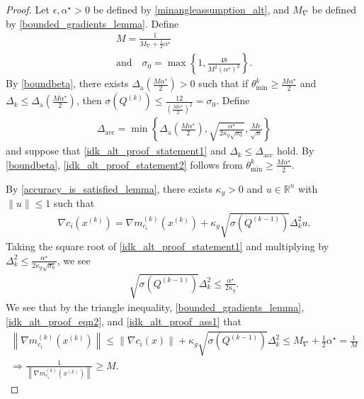\documentclass{article}
\theoremstyle{case}
\numberwithin{theorem}{subsection}
\newcommand{\dacc}{{\Delta_{\textrm{acc}}}}
\newcommand{\dacco}{{\Delta_{\textrm{a}}}}
\newcommand{\dk}{\Delta_k}
\newcommand{\gmcik}{{\nabla m_{c_i}^{(k)}\left(\xk\right)}}
\newcommand{\gradf}{\nabla f}
\newcommand{\maxgrad}{{M_{\nabla}}}
\newcommand{\mfk}{{{m}_f}^{(k)}}
\newcommand{\minanglealpha}{{ \alpha^{\star} }}
\newcommand{\qk}{{Q^{(k)}}}
\newcommand{\Rn}{\mathbb R^n}
\newcommand{\thetamink}{{\theta^k_{\textrm{min}}}}
\newcommand{\tr}{{ B_{\infty}\left(\xk, \dk\right) }}
\newcommand{\xk}{{x^{(k)}}}
\newcommand{\epsactive}{{\mathbb A_c}}
\begin{document}
\begin{proof}
Let $\epsilon, \minanglealpha > 0$ be defined by \cref{minangleassumption_alt}, and $\maxgrad$ be defined by \cref{bounded_gradients_lemma}.
Define
\begin{align}
&M = \frac 1 {\maxgrad + \frac 1 2 \minanglealpha} & \\
&\textrm{and} \quad \sigma_0 = \max\left\{1, \frac{48}{M^2\left(\minanglealpha\right)^2}\right\}.&
\end{align}
By \cref{boundbeta}, there exists $\dacco \left(\frac {M \minanglealpha} 2\right) > 0$ such that if
$\thetamink \ge \frac {M \minanglealpha} 2$ and $\dk \le \dacco \left(\frac {M \minanglealpha} 2\right)$,
then $\sigma\left(\qk\right) \le \frac{12}{\left(\frac{M\minanglealpha}{2}\right)^2} = \sigma_0$.
Define 
\begin{align}
\dacc = \min\left\{
\dacco \left(\frac {M \minanglealpha} 2\right), 
\sqrt{\frac {\minanglealpha}{2\kappa_g\sqrt{\sigma_0}}},
\frac{M \epsilon}{\sqrt{n}}
\right\} \label{define_delta_accuracy2}
\end{align}
and suppose that \cref{idk_alt_proof_statement1} and $\dk \le \dacc$ hold.
By \cref{boundbeta}, \cref{idk_alt_proof_statement2} follows from $\thetamink \ge \frac {M \minanglealpha} 2$.


By \cref{accuracy_is_satisfied_lemma}, there exists $\kappa_{g} > 0$ and $u\in\Rn$ with $\|u\|\le 1$ such that
\begin{align}
\nabla c_i\left(\xk\right) = \gmcik + \kappa_g \sqrt{\sigma\left( Q^{(k-1)} \right)}\dk^2 u. \label{idk_alt_proof_eqn2}
\end{align}
Taking the square root of \cref{idk_alt_proof_statement1} and multiplying by $\dk^2 \le \frac {\minanglealpha}{2\kappa_g\sqrt{\sigma_0}}$, we see
\begin{align}
\sqrt{\sigma\left( Q^{(k-1)} \right)} \dk^2 \le \frac {\minanglealpha} {2\kappa_g}. \label{idk_alt_proof_ass1}
\end{align}
We see that by the triangle inequality, \cref{bounded_gradients_lemma}, \cref{idk_alt_proof_eqn2}, and \cref{idk_alt_proof_ass1} that
\begin{align}
\left\|\gmcik\right\| \le \left\| \nabla c_i\left(x\right)\right\| + \kappa_g \sqrt{\sigma\left( Q^{(k-1)} \right)} \dk^2 \le \maxgrad + \frac 1 2 \minanglealpha = \frac 1 M \nonumber \\
\Longrightarrow \frac 1 {\left\|\gmcik\right\|} \ge M. \label{idk_alt_proof_eqn4}
\end{align}


\end{proof}
\end{document}
